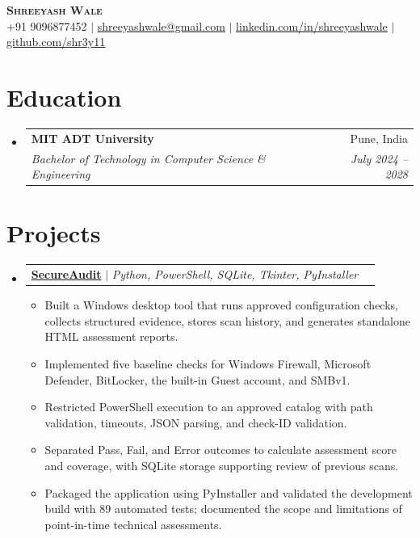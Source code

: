 \documentclass[letterpaper,11pt]{article}
\makeatletter
\newcommand{\resumeItem}[1]{
  \item\small{{#1 \vspace{-2pt}}}
}
\newcommand{\resumeSubheading}[4]{
  \vspace{-2pt}\item
    \begin{tabular*}{0.97\textwidth}[t]{l@{\extracolsep{\fill}}r}
      \textbf{#1} & #2 \\
      \textit{\small#3} & \textit{\small #4} \\
    \end{tabular*}\vspace{-7pt}
}
\newcommand{\resumeProjectHeading}[2]{
  \item
    \begin{tabular*}{0.97\textwidth}{l@{\extracolsep{\fill}}r}
      \small#1 & #2 \\
    \end{tabular*}\vspace{-7pt}
}
\newcommand{\resumeSubHeadingListStart}{\begin{itemize}[leftmargin=0.15in, label={}]}
\newcommand{\resumeSubHeadingListEnd}{\end{itemize}}
\newcommand{\resumeItemListStart}{\begin{itemize}}
\newcommand{\resumeItemListEnd}{\end{itemize}\vspace{-5pt}}
\makeatother
\begin{document}
\begin{center}
    \textbf{\Huge \scshape Shreeyash Wale} \\ \vspace{1pt}
    \small +91 9096877452 $|$
    \href{mailto:shreeyashwale@gmail.com}{\underline{shreeyashwale@gmail.com}} $|$
    \href{https://www.linkedin.com/in/shreeyashwale/}{\underline{linkedin.com/in/shreeyashwale}} $|$
    \href{https://github.com/shr3y11}{\underline{github.com/shr3y11}}
\end{center}

\section{Education}
  \resumeSubHeadingListStart
    \resumeSubheading
      {MIT ADT University}{Pune, India}
      {Bachelor of Technology in Computer Science \& Engineering}{July 2024 -- 2028}
  \resumeSubHeadingListEnd

\section{Projects}
  \resumeSubHeadingListStart
    \resumeProjectHeading
      {\textbf{\href{https://github.com/shr3y11/SecureAudit}{SecureAudit}} $|$ \emph{Python, PowerShell, SQLite, Tkinter, PyInstaller}}{}
      \resumeItemListStart
        \resumeItem{Built a Windows desktop tool that runs approved configuration checks, collects structured evidence, stores scan history, and generates standalone HTML assessment reports.}
        \resumeItem{Implemented five baseline checks for Windows Firewall, Microsoft Defender, BitLocker, the built-in Guest account, and SMBv1.}
        \resumeItem{Restricted PowerShell execution to an approved catalog with path validation, timeouts, JSON parsing, and check-ID validation.}
        \resumeItem{Separated Pass, Fail, and Error outcomes to calculate assessment score and coverage, with SQLite storage supporting review of previous scans.}
        \resumeItem{Packaged the application using PyInstaller and validated the development build with 89 automated tests; documented the scope and limitations of point-in-time technical assessments.}
      \resumeItemListEnd
  \resumeSubHeadingListEnd
\end{document}
